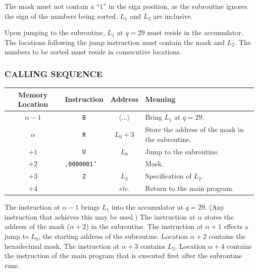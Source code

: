 The mask must not contain a ``1'' in the sign position, as the subroutine ignores the sign of the numbers being sorted. $L_1$ and $L_2$ are inclusive.

Upon jumping to the subroutine, $L_1$ at $q = 29$ must reside in the accumulator. The locations following the jump instruction must contain the mask and $L_2$. The numbers to be sorted must reside in consecutive locations.

\subsubsection*{CALLING SEQUENCE}
\begin{table}[h!]
\centering
\begin{tabularx}{\textwidth}{cccX}
\toprule
\textbf{Memory Location} & \textbf{Instruction} & \textbf{Address} & \textbf{Meaning} \\
\midrule
$\alpha - 1$ & \texttt{B} & $\langle \dots \rangle$ & Bring $L_1$ at $q=29$. \\
$\alpha$     & \texttt{R} & $L_0 + 3$               & Store the address of the mask in the subroutine. \\
$+1$         & \texttt{U} & $L_0$                   & Jump to the subroutine. \\
$+2$         & \multicolumn{2}{l}{\texttt{,0000001'}} & Mask. \\
$+3$         & \texttt{Z} & $L_2$                   & Specification of $L_2$. \\
$+4$         &            & \textit{etc.}           & Return to the main program. \\
\bottomrule
\end{tabularx}
\end{table}

The instruction at $\alpha-1$ brings $L_1$ into the accumulator at $q=29$. (Any instruction that achieves this may be used.) The instruction at $\alpha$ stores the address of the mask ($\alpha+2$) in the subroutine. The instruction at $\alpha+1$ effects a jump to $L_0$, the starting address of the subroutine. Location $\alpha+2$ contains the hexadecimal mask. The instruction at $\alpha+3$ contains $L_2$. Location $\alpha+4$ contains the instruction of the main program that is executed first after the subroutine runs.

